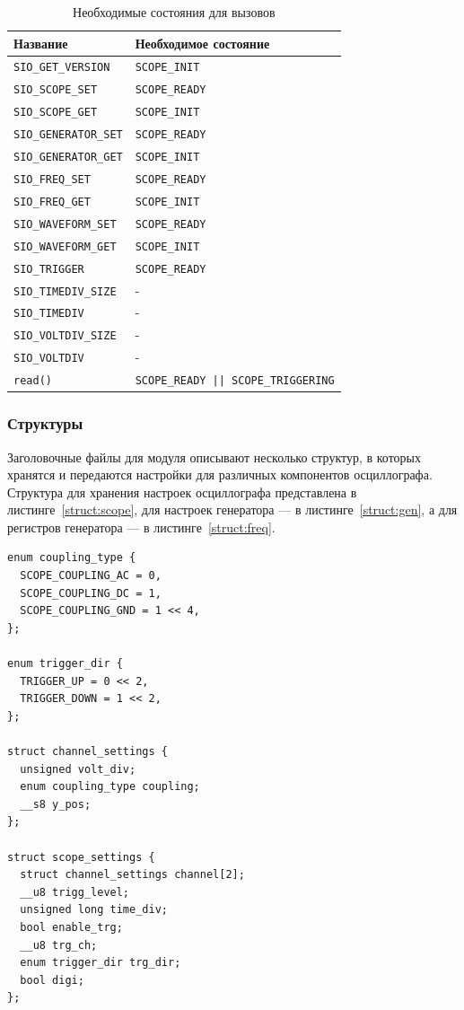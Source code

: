 \documentclass[a4paper,12pt]{report}
\numberwithin{equation}{section}
\begin{document}
\begin{table}[h!]
\begin{tabu} {|l|l|}
\hline
Название & Необходимое состояние \\ \hline
\texttt{SIO\_GET\_VERSION} & \texttt{SCOPE\_INIT} \\ \hline
\texttt{SIO\_SCOPE\_SET} & \texttt{SCOPE\_READY} \\ \hline
\texttt{SIO\_SCOPE\_GET} & \texttt{SCOPE\_INIT} \\ \hline
\texttt{SIO\_GENERATOR\_SET} & \texttt{SCOPE\_READY} \\ \hline
\texttt{SIO\_GENERATOR\_GET} & \texttt{SCOPE\_INIT} \\ \hline
\texttt{SIO\_FREQ\_SET} & \texttt{SCOPE\_READY} \\ \hline
\texttt{SIO\_FREQ\_GET} & \texttt{SCOPE\_INIT} \\ \hline
\texttt{SIO\_WAVEFORM\_SET} & \texttt{SCOPE\_READY} \\ \hline
\texttt{SIO\_WAVEFORM\_GET} & \texttt{SCOPE\_INIT} \\ \hline
\texttt{SIO\_TRIGGER} & \texttt{SCOPE\_READY} \\ \hline
\texttt{SIO\_TIMEDIV\_SIZE} & - \\ \hline
\texttt{SIO\_TIMEDIV} & - \\ \hline
\texttt{SIO\_VOLTDIV\_SIZE} & - \\ \hline
\texttt{SIO\_VOLTDIV} & - \\ \hline
\texttt{read()} & \texttt{SCOPE\_READY || SCOPE\_TRIGGERING} \\ \hline
\end{tabu}
\caption{Необходимые состояния для вызовов}
\label{module:states}
\end{table}

\subsubsection{Структуры}
Заголовочные файлы для модуля описывают несколько структур, в которых хранятся и
передаются настройки для различных компонентов осциллографа. Структура для
хранения настроек осциллографа представлена в листинге~\ref{struct:scope}, для
настроек генератора --- в листинге~\ref{struct:gen}, а для регистров генератора
--- в листинге~\ref{struct:freq}.

\begin{lstlisting}[float=h!,label=struct:scope,caption={Структуры параметров
    осциллографа}]
enum coupling_type {
  SCOPE_COUPLING_AC = 0,
  SCOPE_COUPLING_DC = 1,
  SCOPE_COUPLING_GND = 1 << 4,
};

enum trigger_dir {
  TRIGGER_UP = 0 << 2,
  TRIGGER_DOWN = 1 << 2,
};

struct channel_settings {
  unsigned volt_div;
  enum coupling_type coupling;
  __s8 y_pos;
};

struct scope_settings {
  struct channel_settings channel[2];
  __u8 trigg_level;
  unsigned long time_div;
  bool enable_trg;
  __u8 trg_ch;
  enum trigger_dir trg_dir;
  bool digi;
};
\end{lstlisting}
\end{document}
